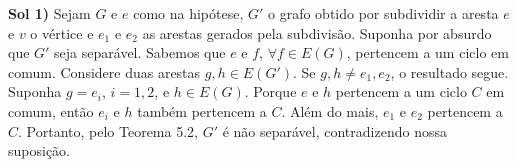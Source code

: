 
{\bf Sol 1)} Sejam $G$ e $e$ como na hipótese, $G'$ o grafo obtido por
subdividir a aresta $e$ e $v$ o vértice e $e_1$ e $e_2$ as arestas gerados pela
subdivisão.  Suponha por absurdo que $G'$ seja separável. Sabemos que $e$ e
$f$, $\forall f \in E(G)$, pertencem a um ciclo em comum. Considere duas
arestas $g, h \in E(G')$.  Se $g,h \ne e_1, e_2$, o resultado segue. Suponha $g
= e_i$, $i = 1, 2$, e $h \in E(G)$. Porque $e$ e $h$ pertencem a um ciclo $C$
em comum, então $e_i$ e $h$ também pertencem a $C$. Além do mais, $e_1$ e $e_2$
pertencem a $C$.  Portanto, pelo Teorema 5.2, $G'$ é não separável,
contradizendo nossa suposição.

